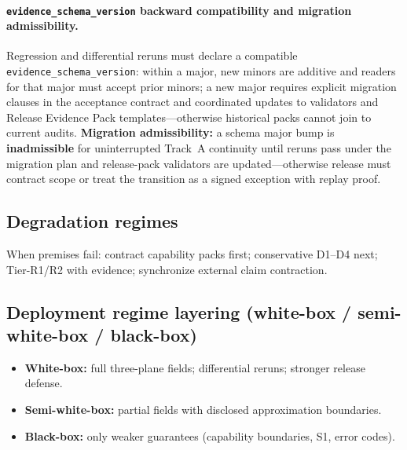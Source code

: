 \documentclass[11pt,a4paper]{report}
\begin{document}
\paragraph{\texttt{evidence\_schema\_version} backward compatibility and migration admissibility.} Regression and differential reruns must declare a compatible \texttt{evidence\_schema\_version}: within a major, new minors are additive and readers for that major must accept prior minors; a new major requires explicit migration clauses in the acceptance contract and coordinated updates to validators and Release Evidence Pack templates---otherwise historical packs cannot join to current audits. \textbf{Migration admissibility:} a schema major bump is \textbf{inadmissible} for uninterrupted Track~A continuity until reruns pass under the migration plan and release-pack validators are updated---otherwise release must contract scope or treat the transition as a signed exception with replay proof.

\subsection{Degradation regimes}
When premises fail: contract capability packs first; conservative D1--D4 next; Tier-R1/R2 with evidence; synchronize external claim contraction.

\subsection{Deployment regime layering (white-box / semi-white-box / black-box)}
\begin{itemize}
  \item \textbf{White-box:} full three-plane fields; differential reruns; stronger release defense.
  \item \textbf{Semi-white-box:} partial fields with disclosed approximation boundaries.
  \item \textbf{Black-box:} only weaker guarantees (capability boundaries, S1, error codes).
\end{itemize}
\end{document}
